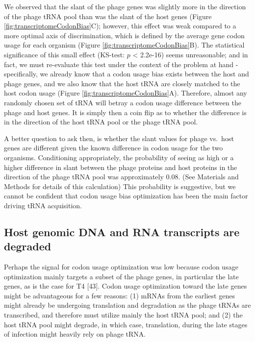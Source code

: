 \documentclass[12pt,twoside]{mitthesis-manusdown}
\begin{document}
We observed that the slant of the phage genes was slightly more in the
direction of the phage tRNA pool than was the slant of the host genes
(Figure \ref{fig:transcriptomeCodonBias}C); however, this effect was
weak compared to a more optimal axis of discrimination, which is defined
by the average gene codon usage for each organism (Figure
\ref{fig:transcriptomeCodonBias}B). The statistical significance of this
small effect (KS-test: \(p\) \textless{} 2.2e-16) seems unreasonable;
and in fact, we must re-evaluate this test under the context of the
problem at hand - specifically, we already know that a codon usage bias
exists between the host and phage genes, and we also know that the host
tRNA are closely matched to the host codon usage (Figure
\ref{fig:transcriptomeCodonBias}A). Therefore, almost any randomly
chosen set of tRNA will betray a codon usage difference between the
phage and host genes. It is simply then a coin flip as to whether the
difference is in the direction of the host tRNA pool or the phage tRNA
pool.

A better question to ask then, is whether the slant values for phage
vs.~host genes are different given the known difference in codon usage
for the two organisms. Conditioning appropriately, the probability of
seeing as high or a higher difference in slant between the phage
proteins and host proteins in the direction of the phage tRNA pool was
approximately 0.08. (See Materials and Methods for details of this
calculation) This probability is suggestive, but we cannot be confident
that codon usage bias optimization has been the main factor driving tRNA
acquisition.

\subsection{Host genomic DNA and RNA transcripts are
degraded}\label{host-genomic-dna-and-rna-transcripts-are-degraded}

Perhaps the signal for codon usage optimization was low because codon
usage optimization mainly targets a subset of the phage genes, in
particular the late genes, as is the case for T4 {[}43{]}. Codon usage
optimization toward the late genes might be advantageous for a few
reasons: (1) mRNAs from the earliest genes might already be undergoing
translation and degradation as the phage tRNAs are transcribed, and
therefore must utilize mainly the host tRNA pool; and (2) the host tRNA
pool might degrade, in which case, translation, during the late stages
of infection might heavily rely on phage tRNA.
\end{document}

